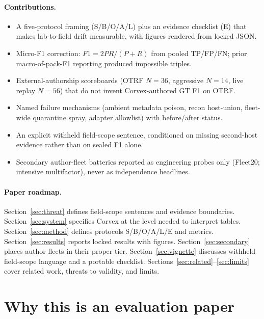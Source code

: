 \documentclass[conference,compsoc]{IEEEtran}
\begin{document}
\paragraph{Contributions.}
\begin{itemize}
\item A five-protocol framing (S/B/O/A/L) plus an evidence checklist (E) that
makes lab-to-field drift measurable, with figures rendered from locked JSON.
\item Micro-F1 correction: $F1=2PR/(P{+}R)$ from pooled TP/FP/FN; prior
macro-of-pack-F1 reporting produced impossible triples.
\item External-authorship scoreboards (OTRF $N{=}36$, aggressive $N{=}14$,
live replay $N{=}56$) that do not invent Corvex-authored GT F1 on OTRF.
\item Named failure mechanisms (ambient metadata poison, recon host-union,
fleet-wide quarantine spray, adapter allowlist) with before/after status.
\item An explicit withheld field-scope sentence, conditioned on missing
second-host evidence rather than on sealed F1 alone.
\item Secondary author-fleet batteries reported as engineering probes only
(Fleet20; intensive multifactor), never as independence headlines.
\end{itemize}

\paragraph{Paper roadmap.}
Section~\ref{sec:threat} defines field-scope sentences and evidence
boundaries.
Section~\ref{sec:system} specifies Corvex at the level needed to interpret
tables.
Section~\ref{sec:method} defines protocols S/B/O/A/L/E and metrics.
Section~\ref{sec:results} reports locked results with figures.
Section~\ref{sec:secondary} places author fleets in their proper tier.
Section~\ref{sec:vignette} discusses withheld field-scope language and a
portable checklist.
Sections~\ref{sec:related}--\ref{sec:limits} cover related work, threats to
validity, and limits.

\section{Why this is an evaluation paper}
\label{sec:why}
\end{document}
